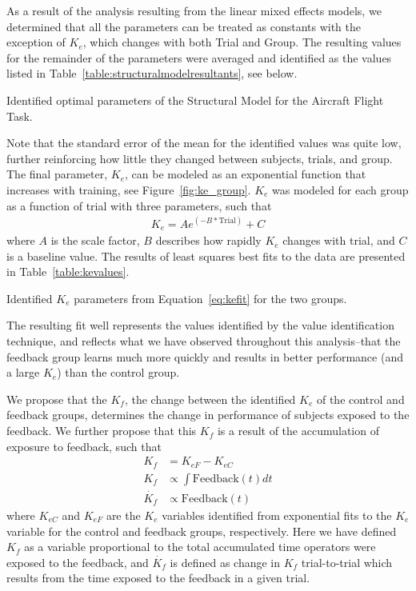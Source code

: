 As a result of the analysis resulting from the linear mixed effects models, we determined that all the parameters can be treated as constants with the exception of $K_e$, which changes with both Trial and Group.
The resulting values for the remainder of the parameters were averaged and identified as the values listed in Table~\ref{table:structuralmodelresultants}, see below.
\begin{table}[tb]
    \centering
    \caption[Identified optimal parameters of the Structural Model for the Aircraft Flight Task]{Identified optimal parameters of the Structural Model for the Aircraft Flight Task.}
    \label{table:structuralmodelresultants}
\end{table}
Note that the standard error of the mean for the identified values was quite low, further reinforcing how little they changed between subjects, trials, and group.
The final parameter, $K_e$, can be modeled as an exponential function that increases with training, see Figure~\ref{fig:ke_group}.
$K_e$ was modeled for each group as a function of trial with three parameters, such that
\begin{align} \label{eq:kefit}
    K_e = A e^{(-B*\mbox{Trial})}+C
\end{align}
where $A$ is the scale factor, $B$ describes how rapidly $K_e$ changes with trial, and $C$ is a baseline value.
The results of least squares best fits to the data are presented in Table~\ref{table:kevalues}.
\begin{table}[tb]
    \centering
    \caption[Identified $K_e$ parameters for the two groups]{Identified $K_e$ parameters from Equation~\ref{eq:kefit} for the two groups.}
    \label{table:kevalues}
\end{table}
The resulting fit well represents the values identified by the value identification technique, and reflects what we have observed throughout this analysis--that the feedback group learns much more quickly and results in better performance (and a large $K_e$) than the control group.

We propose that the $K_f$, the change between the identified $K_e$ of the control and feedback groups, determines the change in performance of subjects exposed to the feedback.
We further propose that this $K_f$ is a result of the accumulation of exposure to feedback, such that
\begin{align}
    K_f       & = K_{eF} - K_{eC}                  \\
    K_f       & \propto \int \mbox{Feedback}(t) dt \\
    \dot{K_f} & \propto \mbox{Feedback}(t)
\end{align}
where $K_{eC}$ and $K_{eF}$ are the $K_e$ variables identified from exponential fits to the $K_e$ variable for the control and feedback groups, respectively.
Here we have defined $K_f$ as a variable proportional to the total accumulated time operators were exposed to the feedback, and $\dot{K_f}$ is defined as change in $K_f$ trial-to-trial which results from the time exposed to the feedback in a given trial.

